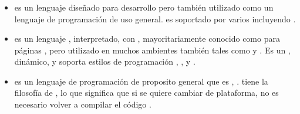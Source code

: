 \subsubsection{\serverSide \scriptingLanguagePL}
	\begin{itemize}
		\item \textbf{\phpNAME} es un lenguaje \scripting \serverSide diseñado para desarrollo \webINT pero también utilizado como un lenguaje de programación de uso general\cite{online_technology_php}. \phpNAME es soportado por varios \webserverINT incluyendo \apacheNAME \httpNAME \serverAS.

		\item \textbf{\javaScriptNAME} es un lenguaje \lightweightPL, interpretado, \objectOrientedPL con \firstClassFuncPL, mayoritariamente conocido como \scriptingLanguagePL para páginas \webINT, pero utilizado en muchos ambientes \nonBrowserINT también tales como \nodejsNAME y \apacheNAME \couchdbNAME. Es un \scriptingLanguagePL \prototypeBasedPL, \multiParadigmPL dinámico, y soporta estilos de programación \objectOrientedPL, \imperativePL, y \functionalPL \cite{online_technology_mozilla_javascript}. 
		\item \textbf{\javaNAME} es un lenguaje de programación de proposito general que es \objectOrientedPL, \concurrentPL \classBasedPL \cite{online_technology_mozilla_javascript}. \javaNAME tiene la filosofía de \writeOnceRunAnyPL, lo que significa que si se quiere cambiar de plataforma, no es necesario volver a compilar el código \cite{online_java_write_once}.


\end{itemize}
